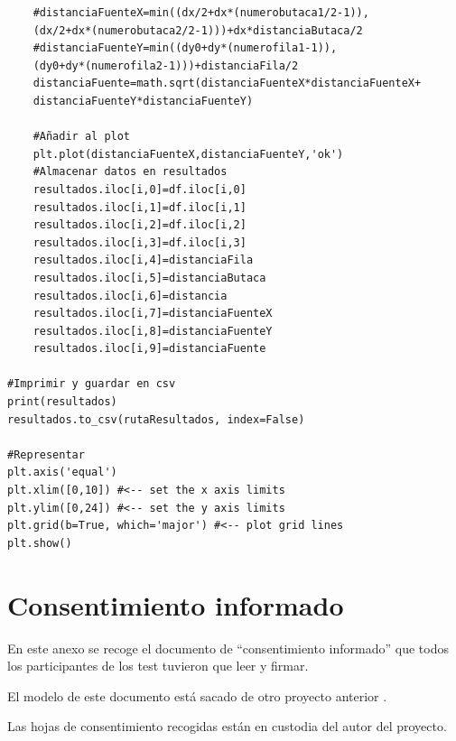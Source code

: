 \documentclass[11pt,a4paper]{book}
\begin{document}
\begin{verbatim}
    #distanciaFuenteX=min((dx/2+dx*(numerobutaca1/2-1)),
    (dx/2+dx*(numerobutaca2/2-1)))+dx*distanciaButaca/2
    #distanciaFuenteY=min((dy0+dy*(numerofila1-1)),
    (dy0+dy*(numerofila2-1)))+distanciaFila/2
    distanciaFuente=math.sqrt(distanciaFuenteX*distanciaFuenteX+
    distanciaFuenteY*distanciaFuenteY)

    #Añadir al plot
    plt.plot(distanciaFuenteX,distanciaFuenteY,'ok')
    #Almacenar datos en resultados
    resultados.iloc[i,0]=df.iloc[i,0]
    resultados.iloc[i,1]=df.iloc[i,1]
    resultados.iloc[i,2]=df.iloc[i,2]
    resultados.iloc[i,3]=df.iloc[i,3]
    resultados.iloc[i,4]=distanciaFila
    resultados.iloc[i,5]=distanciaButaca
    resultados.iloc[i,6]=distancia
    resultados.iloc[i,7]=distanciaFuenteX
    resultados.iloc[i,8]=distanciaFuenteY
    resultados.iloc[i,9]=distanciaFuente

#Imprimir y guardar en csv
print(resultados)
resultados.to_csv(rutaResultados, index=False)

#Representar
plt.axis('equal')
plt.xlim([0,10]) #<-- set the x axis limits
plt.ylim([0,24]) #<-- set the y axis limits
plt.grid(b=True, which='major') #<-- plot grid lines
plt.show()
\end{verbatim}

\chapter{Consentimiento informado}
    En este anexo se recoge el documento de ``consentimiento informado'' que todos los participantes de los test tuvieron que leer y firmar.
    
    El modelo de este documento está sacado de otro proyecto anterior \cite{Tejada2020}.
    
    Las hojas de consentimiento recogidas están en custodia del autor del proyecto.
    
    
\end{document}

